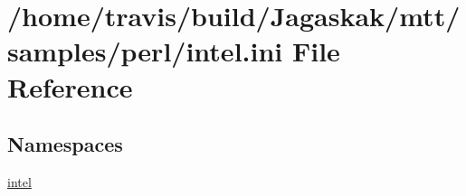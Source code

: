 \hypertarget{intel_8ini}{\section{/home/travis/build/\-Jagaskak/mtt/samples/perl/intel.ini File Reference}
\label{intel_8ini}
}
\subsection*{Namespaces}
\begin{DoxyCompactItemize}
\item 
\hyperlink{namespaceintel}{intel}
\end{DoxyCompactItemize}
